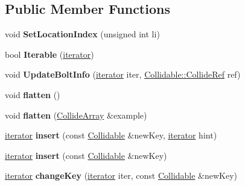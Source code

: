\subsection*{Public Member Functions}
\begin{DoxyCompactItemize}
\item 
void {\bfseries Set\+Location\+Index} (unsigned int li)\hypertarget{classCollideArray_a2a3f9c7d751e5ddd4b27fb3881c8f263}{}\label{classCollideArray_a2a3f9c7d751e5ddd4b27fb3881c8f263}

\item 
bool {\bfseries Iterable} (\hyperlink{classCollidable}{iterator})\hypertarget{classCollideArray_a99f18029467659002727f399ff088db1}{}\label{classCollideArray_a99f18029467659002727f399ff088db1}

\item 
void {\bfseries Update\+Bolt\+Info} (\hyperlink{classCollidable}{iterator} iter, \hyperlink{unionCollidable_1_1CollideRef}{Collidable\+::\+Collide\+Ref} ref)\hypertarget{classCollideArray_a2a89d4a29e5a7b0729cf78b348772987}{}\label{classCollideArray_a2a89d4a29e5a7b0729cf78b348772987}

\item 
void {\bfseries flatten} ()\hypertarget{classCollideArray_abf7d4deda92ec0571172f3bd8c5b9ece}{}\label{classCollideArray_abf7d4deda92ec0571172f3bd8c5b9ece}

\item 
void {\bfseries flatten} (\hyperlink{classCollideArray}{Collide\+Array} \&example)\hypertarget{classCollideArray_a015241ae33ab3e8861c6e990ca98b31d}{}\label{classCollideArray_a015241ae33ab3e8861c6e990ca98b31d}

\item 
\hyperlink{classCollidable}{iterator} {\bfseries insert} (const \hyperlink{classCollidable}{Collidable} \&new\+Key, \hyperlink{classCollidable}{iterator} hint)\hypertarget{classCollideArray_a630fea81f5982845d2b7aa5c3f3e9c1b}{}\label{classCollideArray_a630fea81f5982845d2b7aa5c3f3e9c1b}

\item 
\hyperlink{classCollidable}{iterator} {\bfseries insert} (const \hyperlink{classCollidable}{Collidable} \&new\+Key)\hypertarget{classCollideArray_a29abd38a0d40a6984b895effd4ccf38b}{}\label{classCollideArray_a29abd38a0d40a6984b895effd4ccf38b}

\item 
\hyperlink{classCollidable}{iterator} {\bfseries change\+Key} (\hyperlink{classCollidable}{iterator} iter, const \hyperlink{classCollidable}{Collidable} \&new\+Key)\hypertarget{classCollideArray_ab97f997cc5fa4e019c7c61c63b7059d9}{}\label{classCollideArray_ab97f997cc5fa4e019c7c61c63b7059d9}


\end{DoxyCompactItemize}
